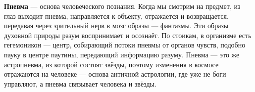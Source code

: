 \textbf{Пневма} --- основа человеческого познания. Когда мы смотрим на предмет, из глаз выходит пневма, направляется к объекту, отражается и возвращается, передавая через зрительный нерв в мозг образы --- фантазмы. Эти образы духовной природы разум воспринимает и осознаёт. По стоикам, в организме есть гегемоникон --- центр, собирающий потоки пневмы от органов чувств, подобно пауку в центре паутины, передающий информацию разуму. Пневма --- это же астропневма, из которой состоят звёзды, поэтому изменения в космосе отражаются на человеке --- основа античной астрологии, где уже не боги управляют, а пневма связывает человека и звёзды.

